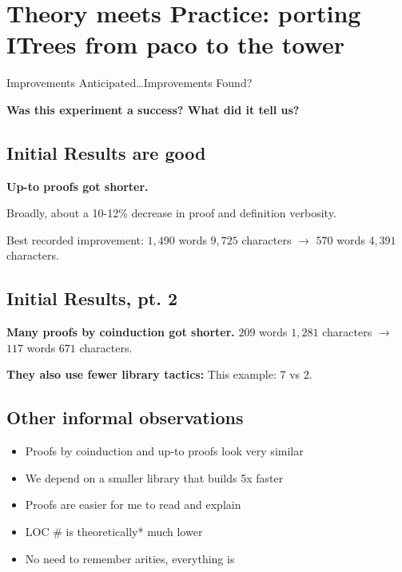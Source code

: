 \section{Theory meets Practice: porting ITrees from paco to the tower}
\label{sec:experiment}

Improvements Anticipated\ldots Improvements Found?

\textbf{Was this experiment a success? What did it tell us?}



\subsection{Initial Results are good}

\textbf{Up-to proofs got shorter.}

Broadly, about a 10-12\% decrease in proof and definition verbosity.

Best recorded improvement: $1{,}490$ words $9{,}725$ characters $\to$ $570$ words
$4{,}391$ characters. 


\subsection{Initial Results, pt. 2}

\textbf{Many proofs by coinduction got shorter.} $209$ words $1{,}281$ characters
$\to$ $117$ words $671$ characters.

\textbf{They also use fewer library tactics:} This example: 7 vs 2.

\subsection{Other informal observations}

\begin{itemize}
  \item Proofs by coinduction and up-to proofs look very similar
  \item We depend on a smaller library that builds 5x faster
  \item Proofs are easier for me to read and explain
  \item LOC \# is theoretically* much lower
  \item No need to remember arities, everything is 
\end{itemize}

